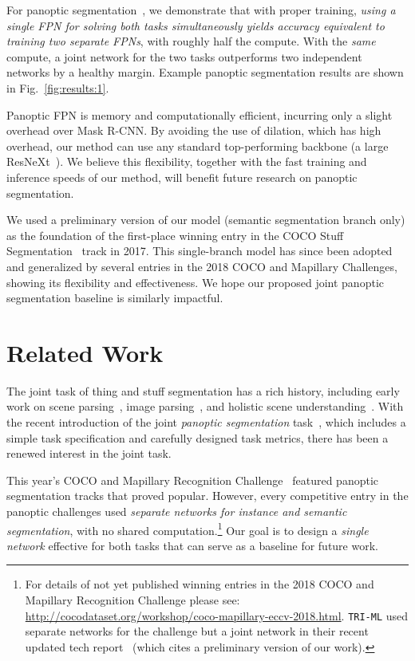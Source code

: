 \documentclass[10pt,twocolumn,letterpaper]{article}
\makeatletter
\renewcommand\paragraph{\@startsection{paragraph}{4}{\z@}{.5em \@plus1ex \@minus.1ex}{-.5em}{\normalfont\normalsize\bfseries}}
\makeatother
\begin{document}
{For panoptic segmentation~\cite{kirillov2017panoptic}, we demonstrate that with proper training, \emph{using a single FPN for solving both tasks simultaneously yields accuracy equivalent to training two separate FPNs}, with roughly half the compute. With the \emph{same} compute, a joint network for the two tasks outperforms two independent networks by a healthy margin. Example panoptic segmentation results are shown in Fig.~\ref{fig:results:1}.

Panoptic FPN is memory and computationally efficient, incurring only a slight overhead over Mask R-CNN\@. By avoiding the use of dilation, which has high overhead, our method can use any standard top-performing backbone (\eg a large ResNeXt~\cite{xie2017aggregated}). We believe this flexibility, together with the fast training and inference speeds of our method, will benefit future research on panoptic segmentation.

We used a preliminary version of our model (semantic segmentation branch only) as the foundation of the first-place winning entry in the COCO Stuff Segmentation~\cite{caesar2016coco} track in 2017. This single-branch model has since been adopted and generalized by several entries in the 2018 COCO and Mapillary Challenges, showing its flexibility and effectiveness. We hope our proposed joint panoptic segmentation baseline is similarly impactful.

\section{Related Work}

\paragraph{Panoptic segmentation:} The joint task of thing and stuff segmentation has a rich history, including early work on scene parsing~\cite{tighe2014scene}, image parsing~\cite{tu2005image}, and holistic scene understanding~\cite{yao2012describing}. With the recent introduction of the joint \emph{panoptic segmentation} task~\cite{kirillov2017panoptic}, which includes a simple task specification and carefully designed task metrics, there has been a renewed interest in the joint task.

This year's COCO and Mapillary Recognition Challenge~\cite{lin2014coco, neuhold2017mapillary} featured panoptic segmentation tracks that proved popular. However, every competitive entry in the panoptic challenges used \emph{separate networks for instance and semantic segmentation}, with no shared computation.\footnote{\label{footnote:workshop}For details of not yet published winning entries in the 2018 COCO and Mapillary Recognition Challenge please see: \url{http://cocodataset.org/workshop/coco-mapillary-eccv-2018.html}. {\tt TRI-ML} used separate networks for the challenge but a joint network in their recent updated tech report~\cite{li2018learning} (which cites a preliminary version of our work).} Our goal is to design a \emph{single network} effective for both tasks that can serve as a baseline for future work.

}
\end{document}
